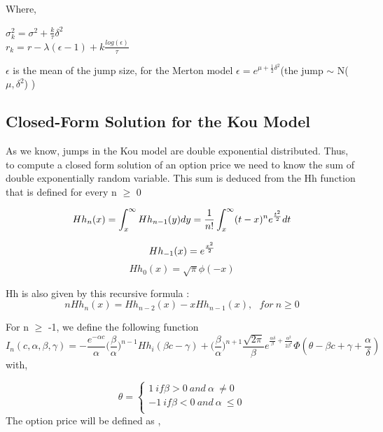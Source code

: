\documentclass[12pt]{report}
\begin{document}
Where,
\begin{center}
$\sigma_k^2=\sigma^2+\frac{k}{\tau} \delta^2$\\
$r_k=r-\lambda(\epsilon-1)+k \frac{log(\epsilon)}{\tau}$\\
\end{center} 
$\epsilon$ is the mean of the jump size, for the Merton model $\epsilon = e^{\mu+\frac{1}{2}\delta^2}$(the jump $\sim$ N($\mu,\delta^2$) )
\subsection{Closed-Form Solution for the Kou Model}

As we know, jumps in the Kou model are double exponential distributed. Thus, to compute a closed form solution of an option price we need to know the sum of double exponentially random variable.
This sum is deduced from the Hh function that is defined for every n $\geqslant$ 0 

\begin{equation}
Hh_n(x)=\int_{x}^{\infty}Hh_{n-1}(y)dy=\frac{1}{n!}\int_{x}^{\infty}(t-x)^n e^{\frac{t^2}{2}}dt\\
\end{equation}

\begin{multicols}{2}\noindent
\begin{equation}
Hh_{-1}(x)=e^{\frac{x^2}{2}}\\
\end{equation}
\begin{equation}
Hh_{0}(x)=\sqrt{\pi }\phi(-x) 
\end{equation}
\end{multicols}
Hh is also given by this recursive formula :
\begin{equation}
nHh_n(x)=Hh_{n-2}(x)-xHh_{n-1}(x), ~~~ for~ n \geqslant 0
\end{equation}

For n $\geqslant$ -1, we define the following function
\begin{equation}
I_n(c,\alpha,\beta,\gamma)=- \frac{e^{-\alpha c}}{\alpha} \big(\frac{\beta}{\alpha}\big)^{n-1}Hh_i(\beta c - \gamma)+\big(\frac{\beta}{\alpha}\big)^{n+1} \frac{\sqrt{2\pi}}{\beta}e^{\frac{\alpha \delta}{\beta}+\frac{\alpha^2}{2\beta^2}} \Phi(\theta-\beta c +\gamma+ \frac{\alpha}{\delta})
\end{equation}
with,

 \[\theta= \begin{cases} 
  1~ if \beta >0 ~and ~\alpha ~\neq  0\\
    -1~ if \beta < 0 ~and ~\alpha ~\leqslant 0\\
         \end{cases}
          \]
The option price will be defined as ,
\end{document}
